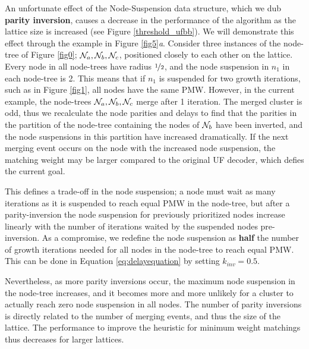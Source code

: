 An unfortunate effect of the Node-Suspension data structure, which we dub \textbf{parity inversion}, causes a decrease in the performance of the algorithm as the lattice size is increased (see Figure \ref{threshold_ufbb}). We will demonstrate this effect through the example in Figure \ref{fig5}\emph{a}. Consider three instances of the node-tree of Figure \ref{fig0}; $\mathcal{N}_a, \mathcal{N}_b, \mathcal{N}_c$, positioned closely to each other on the lattice. Every node in all node-trees have radius $\nicefrac{1}{2}$, and the node suspension in $n_1$ in each node-tree is 2. This means that if $n_1$ is suspended for two growth iterations, such as in Figure \ref{fig1}, all nodes have the same PMW. However, in the current example, the node-trees $\mathcal{N}_a, \mathcal{N}_b, \mathcal{N}_c$ merge after 1 iteration. The merged cluster is odd, thus we recalculate the node parities and delays to find that the parities in the partition of the node-tree containing the nodes of $\mathcal{N}_b$ have been inverted, and the node suspensions in this partition have increased dramatically. If the next merging event occurs on the node with the increased node suspension, the matching weight may be larger compared to the original UF decoder, which defies the current goal. 

This defines a trade-off in the node suspension; a node must wait as many iterations as it is suspended to reach equal PMW in the node-tree, but after a parity-inversion the node suspension for previously prioritized nodes increase linearly with the number of iterations waited by the suspended nodes pre-inversion. As a compromise, we redefine the node suspension as \textbf{half} the number of growth iterations needed for all nodes in the node-tree to reach equal PMW. This can be done in Equation \eqref{eq:delayequation} by setting $k_{inv}=0.5$.

Nevertheless, as more parity inversions occur, the maximum node suspension in the node-tree increases, and it becomes more and more unlikely for a cluster to actually reach zero node suspension in all nodes. The number of parity inversions is directly related to the number of merging events, and thus the size of the lattice. The performance to improve the heuristic for minimum weight matchings thus decreases for larger lattices. 

